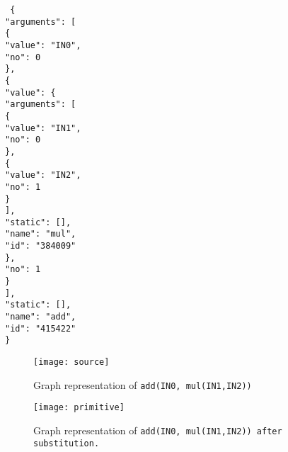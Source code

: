 \texttt{
\{\\
\indent "arguments": [\\
\indent \indent \{\\
\indent \indent \indent "value": "IN0",\\
\indent \indent \indent "no": 0\\
\indent \indent \},\\
\indent \indent \{\\
\indent \indent \indent "value": \{\\
\indent \indent \indent \indent "arguments": [\\
\indent \indent \indent \indent \indent \{\\
\indent \indent \indent \indent \indent \indent "value": "IN1",\\
\indent \indent \indent \indent \indent \indent "no": 0\\
\indent \indent \indent \indent \indent \},\\
\indent \indent \indent \indent \indent \{\\
\indent \indent \indent \indent \indent \indent "value": "IN2",\\
\indent \indent \indent \indent \indent \indent "no": 1\\
\indent \indent \indent \indent \indent \}\\
\indent \indent \indent \indent ],\\
\indent \indent \indent \indent "static": [],\\
\indent \indent \indent \indent "name": "mul",\\
\indent \indent \indent \indent "id": "384009"\\
\indent \indent \indent \},\\
\indent \indent \indent "no": 1\\
\indent \indent \}\\
\indent ],\\
\indent "static": [],\\
\indent "name": "add",\\
\indent "id": "415422"\\
\}
}

\begin{figure}
\centering
\texttt{[image: source]}
\caption{Graph representation of \texttt{add(IN0, mul(IN1,IN2))}}
\label{source_graph}
\end{figure}

\begin{figure*}
\centering
\texttt{[image: primitive]}
\caption{Graph representation of \texttt{add(IN0, mul(IN1,IN2)) after substitution.}}
\label{primitive_graph}
\end{figure*}

